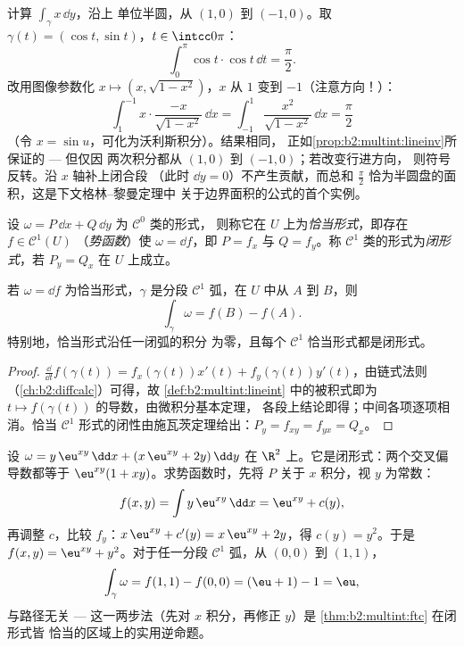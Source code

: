 \begin{example}\label{ex:b2:multint:semicircle}
计算 $\int_\gamma x\,\dd y$，沿上
单位半圆，从 $(1, 0)$ 到 $(-1, 0)$。取 $\gamma(t) =
(\cos t, \sin t)$，$t \in \intcc0\pi$：
\[
\int_0^\pi\cos t\cdot\cos t\,\dd t = \frac\pi2 .
\]
改用图像参数化 $x \mapsto (x, \sqrt{1 -
x^2})$，$x$ 从 $1$ 变到 $-1$（注意方向！）：
\[
\int_1^{-1}x\cdot\frac{-x}{\sqrt{1 - x^2}}\,\dd x
= \int_{-1}^{1}\frac{x^2}{\sqrt{1 - x^2}}\,\dd x
= \frac\pi2
\]
（令 $x = \sin u$，可化为沃利斯积分）。结果相同，
正如\cref{prop:b2:multint:lineinv}所保证的 --- 但仅因
两次积分都从 $(1,0)$ 到 $(-1,0)$；若改变行进方向，
则符号反转。沿 $x$ 轴补上闭合段
（此时 $\dd y = 0$）不产生贡献，而总和 $\frac\pi2$
恰为半圆盘的面积，这是下文格林--黎曼定理中
关于边界面积的公式的首个实例。
\end{example}

\begin{definition}[恰当形式与闭形式]\label{def:b2:multint:exact}
设 $\omega = P\,\dd x + Q\,\dd y$ 为 $\mathcal{C}^0$ 类的形式，
则称它在 $U$ 上为\emph{恰当形式}，即存在 $f \in \mathcal{C}^1(U)$
（\emph{势函数}）使 $\omega = \dd f$，即 $P = f_x$ 与 $Q
= f_y$。称 $\mathcal{C}^1$ 类的形式为\emph{闭形式}，若 $P_y = Q_x$ 在
$U$ 上成立。
\end{definition}

\begin{theorem}\label{thm:b2:multint:ftc}
若 $\omega = \dd f$ 为恰当形式，$\gamma$ 是分段
$\mathcal{C}^1$ 弧，在 $U$ 中从 $A$ 到 $B$，则
\[
\int_\gamma \omega = f(B) - f(A) .
\]
特别地，恰当形式沿任一闭弧的积分
为零，且每个 $\mathcal{C}^1$ 恰当形式都是闭形式。
\end{theorem}

\begin{proof}
$\frac{\dd}{\dd t}f(\gamma(t)) = f_x(\gamma(t))x'(t) +
f_y(\gamma(t))y'(t)$，由链式法则
（\cref{ch:b2:diffcalc}）可得，故
\cref{def:b2:multint:lineint} 中的被积式即为 $t \mapsto
f(\gamma(t))$ 的导数，由微积分基本定理，
各段上结论即得；中间各项逐项相消。恰当
$\mathcal{C}^1$ 形式的闭性由施瓦茨定理给出：$P_y =
f_{xy} = f_{yx} = Q_x$。
\end{proof}

\begin{example}[重构势函数]\label{ex:b2:multint:potential}
设 $\omega = y\,\eu^{xy}\,\dd x + (x\,\eu^{xy} + 2y)\,\dd y$
在 $\R^2$ 上。它是闭形式：两个交叉偏导数都等于
$\eu^{xy}(1 + xy)$。求势函数时，先将 $P$ 关于
$x$ 积分，视 $y$ 为常数：
\[
f(x, y) = \int y\,\eu^{xy}\,\dd x = \eu^{xy} + c(y),
\]
再调整 $c$，比较 $f_y$：$x\,\eu^{xy} + c'(y) =
x\,\eu^{xy} + 2y$，得 $c(y) = y^2$。于是 $f(x,y) = \eu^{xy} +
y^2$。对于任一分段 $\mathcal C^1$ 弧，从 $(0,0)$
到 $(1,1)$，
\[
\int_\gamma\omega = f(1,1) - f(0,0) = (\eu + 1) - 1 = \eu ,
\]
与路径无关 --- 这一两步法（先对
$x$ 积分，再修正 $y$）是
\cref{thm:b2:multint:ftc} 在闭形式皆
恰当的区域上的实用逆命题。
\end{example}

